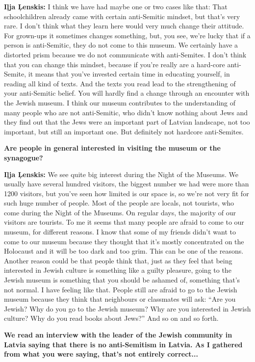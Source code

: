 \textbf{Iļja Ļenskis:} I think we have had maybe one or two cases like that: That schoolchildren already came with certain anti-Semitic mindset, but that’s very rare. I don’t think what they learn here would very much change their attitude. For grown-ups it sometimes changes something, but, you see, we’re lucky that if a person is anti-Semitic, they do not come to this museum. We certainly have a distorted prism because we do not communicate with anti-Semites. 
I don’t think that you can change this mindset, because if you’re really are a hard-core anti-Semite, it means that you’ve invested certain time in educating yourself, in reading all kind of texts. And the texts you read lead to the strengthening of your anti-Semitic belief. You will hardly find a change through an encounter with the Jewish museum. I think our museum contributes to the understanding of many people who are not anti-Semitic, who didn't know nothing about Jews and they find out that the Jews were an important part of Latvian landscape, not too important, but still an important one. But definitely not hardcore anti-Semites. 

\textbf{Are people in general interested in visiting the museum or the synagogue?} 

\textbf{Iļja Ļenskis:} We see quite big interest during the Night of the Museums. We usually have several hundred visitors, the biggest number we had were more than 1200 visitors, but you've seen how limited is our space is, so we’re not very fit for such huge number of people. Most of the people are locals, not tourists, who come during the Night of the Museums. On regular days, the majority of our visitors are tourists. To me it seems that many people are afraid to come to our museum, for different reasons. I know that some of my friends didn't want to come to our museum because they thought that it’s mostly concentrated on the Holocaust and it will be too dark and too grim. This can be one of the reasons. Another reason could be that people think that, just as they feel that being interested in Jewish culture is something like a guilty pleasure, going to the Jewish museum is something that you should be ashamed of, something that's not normal. I have feeling like that. People still are afraid to go to the Jewish museum because they think that neighbours or classmates will ask: ``Are you Jewish? Why do you go to the Jewish museum? Why are you interested in Jewish culture? Why do you read books about Jews?'' And so on and so forth.

\textbf{We read an interview with the leader of the Jewish community in Latvia saying that there is no anti-Semitism in Latvia. As I gathered from what you were saying, that’s not entirely correct...} 

